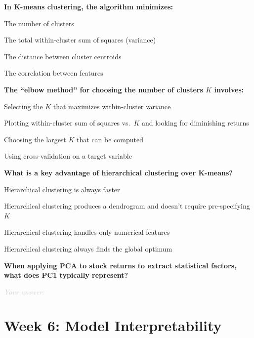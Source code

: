 \documentclass[11pt]{article}
\newcommand{\shortanswer}{%
  \vspace{0.3em}
  \textcolor{LightGray}{\textit{Your answer:} \hrulefill}
  \vspace{0.5em}
}
\begin{document}
\begin{questions}[resume]
\item \textbf{In K-means clustering, the algorithm minimizes:}
\begin{options}
  \item The number of clusters
  \item The total within-cluster sum of squares (variance)
  \item The distance between cluster centroids
  \item The correlation between features
\end{options}

\item \textbf{The ``elbow method'' for choosing the number of clusters $K$ involves:}
\begin{options}
  \item Selecting the $K$ that maximizes within-cluster variance
  \item Plotting within-cluster sum of squares vs.\ $K$ and looking for diminishing returns
  \item Choosing the largest $K$ that can be computed
  \item Using cross-validation on a target variable
\end{options}

\item \textbf{What is a key advantage of hierarchical clustering over K-means?}
\begin{options}
  \item Hierarchical clustering is always faster
  \item Hierarchical clustering produces a dendrogram and doesn't require pre-specifying $K$
  \item Hierarchical clustering handles only numerical features
  \item Hierarchical clustering always finds the global optimum
\end{options}

\item \textbf{When applying PCA to stock returns to extract statistical factors, what does PC1 typically represent?}

\shortanswer

\end{questions}

\newpage
\section*{Week 6: Model Interpretability}
\end{document}

